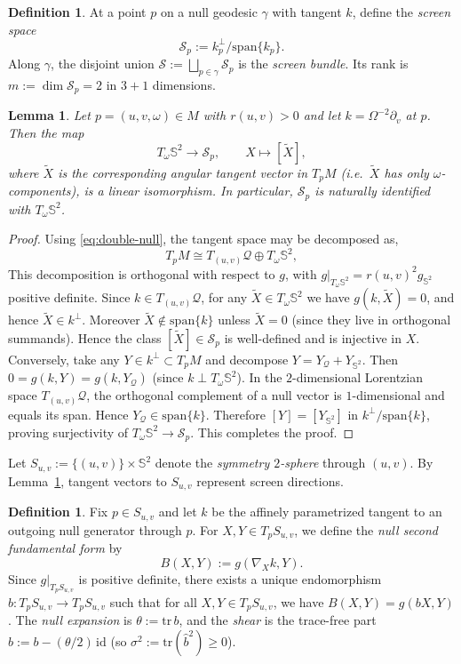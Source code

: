 \documentclass[a4paper, reqno]{amsart}
\numberwithin{equation}{section}
\theoremstyle{plain}
\newtheorem{lemma}[theorem]{Lemma}
\theoremstyle{definition}
\newtheorem{definition}[theorem]{Definition}
\theoremstyle{remark}
\begin{document}
\begin{definition}\label{def:screen}
At a point $p$ on a null geodesic $\gamma$ with tangent $k$, define the \emph{screen space}
$$\mathcal S_p := k_p^\perp / \mathrm{span}\{k_p\}.$$
Along $\gamma$, the disjoint union $\mathcal S:=\bigsqcup_{p\in\gamma}\mathcal S_p$ is the \emph{screen bundle}.
Its rank is $m:=\dim\mathcal S_p=2$ in $3+1$ dimensions.
\end{definition}

\begin{lemma}\label{lem:screen=TS2}
Let $p=(u,v,\omega)\in M$ with $r(u,v)>0$ and let $k=\Omega^{-2}\partial_v$ at $p$.
Then the map
$$
T_\omega\mathbb S^2 \longrightarrow \mathcal S_p,\qquad X \mapsto [\tilde X],
$$
where $\tilde X$ is the corresponding angular tangent vector in $T_pM$ (i.e.\ $\tilde X$ has only $\omega$-components), is a linear isomorphism. In particular, $\mathcal S_p$ is naturally identified with $T_\omega\mathbb S^2$.
\end{lemma}

\begin{proof}
Using \eqref{eq:double-null}, the tangent space may be decomposed as,
$$T_pM \cong T_{(u,v)}\mathcal Q \oplus T_\omega\mathbb S^2,$$
This decomposition is orthogonal with respect to $g$, with $g|_{T_\omega\mathbb S^2}=r(u,v)^2g_{\mathbb{S}^2}$ positive definite. Since $k\in T_{(u,v)}\mathcal Q$, for any $\tilde X\in T_\omega\mathbb S^2$ we have $g(k,\tilde X)=0$, and hence $\tilde X\in k^\perp$. Moreover $\tilde X\notin \mathrm{span}\{k\}$ unless $\tilde X=0$ (since they live in orthogonal summands). Hence the class $[\tilde X]\in \mathcal S_p$ is well-defined and is injective in $X$. Conversely, take any $Y\in k^\perp\subset T_pM$ and decompose $Y=Y_{\mathcal Q}+Y_{\mathbb S^2}$. Then $0=g(k,Y)=g(k,Y_{\mathcal Q})$ (since $k\perp T_\omega\mathbb S^2$). In the $2$-dimensional Lorentzian space $T_{(u,v)}\mathcal Q$, the orthogonal complement of a null vector is $1$-dimensional and equals its span. Hence $Y_{\mathcal Q}\in \mathrm{span}\{k\}$. Therefore $[Y]=[Y_{\mathbb S^2}]$ in $k^\perp/\mathrm{span}\{k\}$, proving
surjectivity of $T_\omega\mathbb S^2\to\mathcal S_p$. This completes the proof.

\end{proof}

Let $S_{u,v}:=\{(u,v)\}\times \mathbb S^2$ denote the \emph{symmetry $2$-sphere} through $(u,v)$. By Lemma~\ref{lem:screen=TS2}, tangent vectors to $S_{u,v}$ represent screen directions.

\begin{definition}\label{def:null2ff}
Fix $p\in S_{u,v}$ and let $k$ be the affinely parametrized tangent to an outgoing null generator through $p$. For $X,Y\in T_pS_{u,v}$, we define the \emph{null second fundamental form} by
$$B(X,Y) := g(\nabla_X k, Y).$$
Since $g|_{T_pS_{u,v}}$ is positive definite, there exists a unique endomorphism $b:T_pS_{u,v}\to T_pS_{u,v}$ such that for all $X,Y\in T_pS_{u,v}$, we have $B(X,Y)=g(bX,Y)$. The \emph{null expansion} is $\theta:=\mathrm{tr}\,b$, and the \emph{shear} is the trace-free part $\hat b:=b-(\theta/2)\,\mathrm{id}$ (so $\sigma^2:=\mathrm{tr}(\hat b^2)\ge 0$).
\end{definition}
\end{document}

